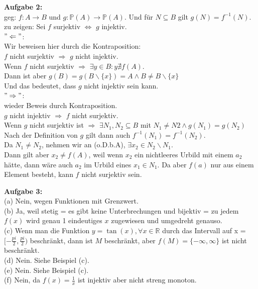 \documentclass[a4paper]{scrartcl}
\begin{document}
	\begin{flushleft}
		\textbf{Aufgabe 2:}\\
		geg: $f:A\rightarrow B$ und $g: \mathbb{P}(A)\rightarrow \mathbb{P}(A)$. Und für $N\subseteq B$ gilt $g(N) = f^{-1}(N)$.\\
		zu zeigen: Sei $f$ surjektiv $\Leftrightarrow$ $g$ injektiv.\\[1em]
		$"\Leftarrow"$:\\
		Wir beweisen hier durch die Kontraposition:\\
		$f$ nicht surjektiv $\Rightarrow$ $g$ nicht injektiv.\\
		Wenn $f$ nicht surjektiv $\Rightarrow$ $\exists y\in B: y \nexists f(A)$.\\
		Dann ist aber $g(B) = g(B\backslash\{x\})=A \wedge B\neq B\backslash \{x\}$\\
		Und das bedeutet, dass $g$ nicht injektiv sein kann.\\[1em]
		$"\Rightarrow"$:\\
		wieder Beweis durch Kontraposition.\\
		$g$ nicht injektiv $\Rightarrow$ $f$ nicht surjektiv.\\
		Wenn $g$ nicht surjektiv ist $\Rightarrow$ $\exists N_1,N_2 \subseteq B$ mit $N_1\neq N2 \wedge g(N_1)=g(N_2)$\\
		Nach der Definition von $g$ gilt dann auch $f^{-1}(N_1)=f^{-1}(N_2)$.\\
		Da $N_1\neq N_2$, nehmen wir an (o.D.b.A), $\exists x_2\in N_2\backslash N_1$.\\
		Dann gilt aber $x_2\neq f(A)$, weil wenn $x_2$ ein nichtleeres Urbild mit einem $a_2$ hätte, dann wäre auch $a_2$ im Urbild eines $x_1\in N_1$. Da aber $f(a)$ nur aus einem Element besteht, kann $f$ nicht surjektiv sein.\\[1em]
	\end{flushleft}
	\begin{flushleft}
		\textbf{Aufgabe 3:}\\		
		(a) Nein, wegen Funktionen mit Grenzwert.\\
		(b) Ja, weil stetig = es gibt keine Unterbrechungen und bijektiv = zu jedem $f(x)$ wird genau 1 eindeutiges  $x$ zugewiesen und umgedreht genauso.\\
		(c) Wenn man die Funktion $y = \tan(x), \forall x\in \mathbb{R}$ durch das Intervall auf x = $[-\frac{pi}{2},\frac{pi}{2})$ beschränkt, dann ist $M$ beschränkt, aber $f(M)=\{-\infty,\infty\}$ ist nicht beschränkt.\\
		(d) Nein. Siehe Beispiel (c).\\  
		(e) Nein. Siehe Beispiel (c).\\  
		(f) Nein, da  $f(x)=\frac{1}{x}$ ist injektiv aber nicht streng monoton. 
	\end{flushleft}
\end{document}
